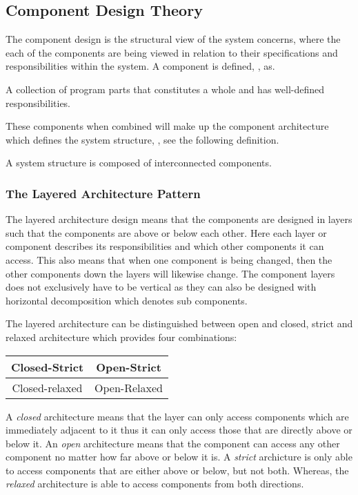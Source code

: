 \subsection{Component Design Theory} \label{sec:archicomponents}
The component design \cite{Rod-Aalborg} is the structural view of the system concerns, where the each of the components are being viewed in relation to their specifications and responsibilities within the system.
A component is defined, \citep[p.~192]{Rod-Aalborg}, as.
\begin{defn}\label{defn:component}
	A collection of program parts that constitutes a whole and has well-defined responsibilities.
\end{defn}

These components when combined will make up the component architecture which defines the system structure, \citep[p.~192]{Rod-Aalborg}, see the following definition.
\begin{defn}\label{defn:Structure}
	A system structure is composed of interconnected components.
\end{defn}

\subsubsection*{The Layered Architecture Pattern}

The layered architecture design means that the components are designed in layers such that the components are above or below each other.
Here each layer or component describes its responsibilities and which other components it can access.
This also means that when one component is being changed, then the other components down the layers will likewise change.
The component layers does not exclusively have to be vertical as they can also be designed with horizontal decomposition which denotes sub components.

The layered architecture can be distinguished between open and closed, strict and relaxed architecture which provides four combinations:

\begin{center}
	\begin{tabular}{| c | c |}
		\hline
		Closed-Strict & Open-Strict \\
		\hline
		Closed-relaxed & Open-Relaxed \\
		\hline
	\end{tabular}
\end{center}

A \textit{closed} architecture means that the layer can only access components which are immediately adjacent to it thus it can only access those that are directly above or below it.
An \textit{open} architecture means that the component can access any other component no matter how far above or below it is.
A \textit{strict} archicture is only able to access components that are either above or below, but not both.
Whereas, the \textit{relaxed} architecture is able to access components from both directions.

